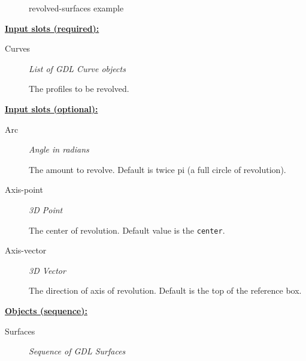 \documentclass [11pt]{book}
\begin{document}
\begin{itemize}
\begin{figure}
\caption{revolved-surfaces example}

\label{fig:revolved-surfaces}

\end{figure}





\textbf{
\underline{Input slots (required):}}

\begin{description}

\item [Curves]
\emph{List of GDL Curve objects}

 The profiles to be revolved.




\end{description}






\textbf{
\underline{Input slots (optional):}}

\begin{description}

\item [Arc]
\emph{Angle in radians}

 The amount to revolve. Default is twice pi (a full circle of revolution).




\item [Axis-point]
\emph{3D Point}

 The center of revolution. Default value is the \texttt{center}.




\item [Axis-vector]
\emph{3D Vector}

 The direction of axis of revolution. Default is the top of the reference box.




\end{description}






\textbf{
\underline{Objects (sequence):}}

\begin{description}

\item [Surfaces]
\emph{Sequence of GDL Surfaces}


\end{description}
\end{itemize}
\end{document}
